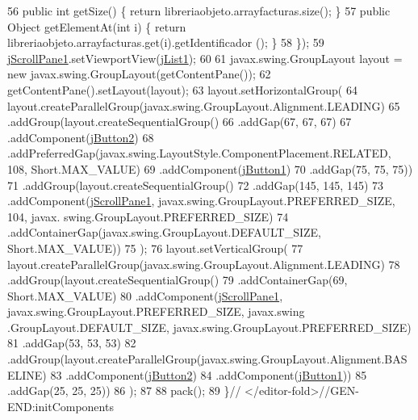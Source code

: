 \begin{DoxyCode}
56             \textcolor{keyword}{public} \textcolor{keywordtype}{int} getSize() \{ \textcolor{keywordflow}{return} libreriaobjeto.arrayfacturas.size(); \}
57             \textcolor{keyword}{public} Object getElementAt(\textcolor{keywordtype}{int} i) \{ \textcolor{keywordflow}{return} libreriaobjeto.arrayfacturas.get(i).getIdentificador
      (); \}
58         \});
59         \mbox{\hyperlink{class_interfaz_package_1_1facturas_aaf7b2113c167e17f0be9bea690595685}{jScrollPane1}}.setViewportView(\mbox{\hyperlink{class_interfaz_package_1_1facturas_adbdef786d8dff4c1b59ff2a1308ed6c5}{jList1}});
60 
61         javax.swing.GroupLayout layout = \textcolor{keyword}{new} javax.swing.GroupLayout(getContentPane());
62         getContentPane().setLayout(layout);
63         layout.setHorizontalGroup(
64             layout.createParallelGroup(javax.swing.GroupLayout.Alignment.LEADING)
65             .addGroup(layout.createSequentialGroup()
66                 .addGap(67, 67, 67)
67                 .addComponent(\mbox{\hyperlink{class_interfaz_package_1_1facturas_acf837914fb3ffc261c9cdb1174c6d9bc}{jButton2}})
68                 .addPreferredGap(javax.swing.LayoutStyle.ComponentPlacement.RELATED, 108, Short.MAX\_VALUE)
69                 .addComponent(\mbox{\hyperlink{class_interfaz_package_1_1facturas_adb32118a114d1f85a76fafb76589f8c6}{jButton1}})
70                 .addGap(75, 75, 75))
71             .addGroup(layout.createSequentialGroup()
72                 .addGap(145, 145, 145)
73                 .addComponent(\mbox{\hyperlink{class_interfaz_package_1_1facturas_aaf7b2113c167e17f0be9bea690595685}{jScrollPane1}}, javax.swing.GroupLayout.PREFERRED\_SIZE, 104, javax.
      swing.GroupLayout.PREFERRED\_SIZE)
74                 .addContainerGap(javax.swing.GroupLayout.DEFAULT\_SIZE, Short.MAX\_VALUE))
75         );
76         layout.setVerticalGroup(
77             layout.createParallelGroup(javax.swing.GroupLayout.Alignment.LEADING)
78             .addGroup(layout.createSequentialGroup()
79                 .addContainerGap(69, Short.MAX\_VALUE)
80                 .addComponent(\mbox{\hyperlink{class_interfaz_package_1_1facturas_aaf7b2113c167e17f0be9bea690595685}{jScrollPane1}}, javax.swing.GroupLayout.PREFERRED\_SIZE, javax.swing
      .GroupLayout.DEFAULT\_SIZE, javax.swing.GroupLayout.PREFERRED\_SIZE)
81                 .addGap(53, 53, 53)
82                 .addGroup(layout.createParallelGroup(javax.swing.GroupLayout.Alignment.BASELINE)
83                     .addComponent(\mbox{\hyperlink{class_interfaz_package_1_1facturas_acf837914fb3ffc261c9cdb1174c6d9bc}{jButton2}})
84                     .addComponent(\mbox{\hyperlink{class_interfaz_package_1_1facturas_adb32118a114d1f85a76fafb76589f8c6}{jButton1}}))
85                 .addGap(25, 25, 25))
86         );
87 
88         pack();
89     \}\textcolor{comment}{// </editor-fold>//GEN-END:initComponents}
\end{DoxyCode}
\mbox{\label{class_interfaz_package_1_1facturas_a46e4e792f309129dc699c57b1cc16d64}} 
